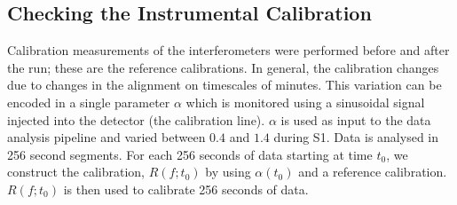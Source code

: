 \subsection{Checking the Instrumental Calibration}
\label{s:calibration}

Calibration measurements of the interferometers were performed before and
after the run; these are the reference calibrations. In general, the
calibration changes due to changes in the alignment on timescales of minutes.
This variation can be encoded in a single parameter $\alpha$ which is
monitored using a sinusoidal signal injected into the
detector (the calibration line)\cite{adhikari2003}. $\alpha$ is used as input
to the data analysis pipeline and varied between $0.4$ and $1.4$ during S1.
Data is analysed in 256 second segments.  For each 256 seconds of data
starting at time $t_0$, we construct the calibration, $R(f;t_0)$ by using
$\alpha(t_0)$ and a reference calibration.  $R(f;t_0)$ is then used to
calibrate 256 seconds of data.

